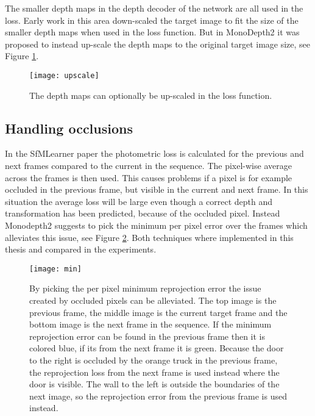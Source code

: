 The smaller depth maps in the depth decoder of the network are all used in the loss. Early work in this area down-scaled the target image to fit the size of the smaller depth maps when used in the loss function. But in MonoDepth2\cite{monodepth2} it was proposed to instead up-scale the depth maps to the original target image size, see Figure \ref{fig:upscale}.

\begin{figure}[H]
	\centering
	\texttt{[image: upscale]}
	\caption{The depth maps can optionally be up-scaled in the loss function.}
	\label{fig:upscale}
\end{figure}

\subsection{Handling occlusions}
\label{sec:occlusion}

\iffalse
\paragraph{Disparity loss} To encourage background depths (low disparities) in shadows of the depth map where occlusion has occurred a penalty on the disparity can be added $ \mathcal{L}_{o} =|d_t|. $
\fi

In the SfMLearner paper\cite{sfmlearner} the photometric loss is calculated for the previous and next frames compared to the current in the sequence. The pixel-wise average across the frames is then used. This causes problems if a pixel is for example occluded in the previous frame, but visible in the current and next frame. In this situation the average loss will be large even though a correct depth and transformation has been predicted, because of the occluded pixel. Instead Monodepth2 suggests to pick the minimum per pixel error over the frames which alleviates this issue, see Figure \ref{fig:min}. Both techniques where implemented in this thesis and compared in the experiments.

\begin{figure}[H]
	\centering
	\texttt{[image: min]}
	\caption{By picking the per pixel minimum reprojection error the issue created by occluded pixels can be alleviated. The top image is the previous frame, the middle image is the current target frame and the bottom image is the next frame in the sequence. If the minimum reprojection error can be found in the previous frame then it is colored blue, if its from the next frame it is green. Because the door to the right is occluded by the orange truck in the previous frame, the reprojection loss from the next frame is used instead where the door is visible. The wall to the left is outside the boundaries of the next image, so the reprojection error from the previous frame is used instead.}
	\label{fig:min}
\end{figure}

